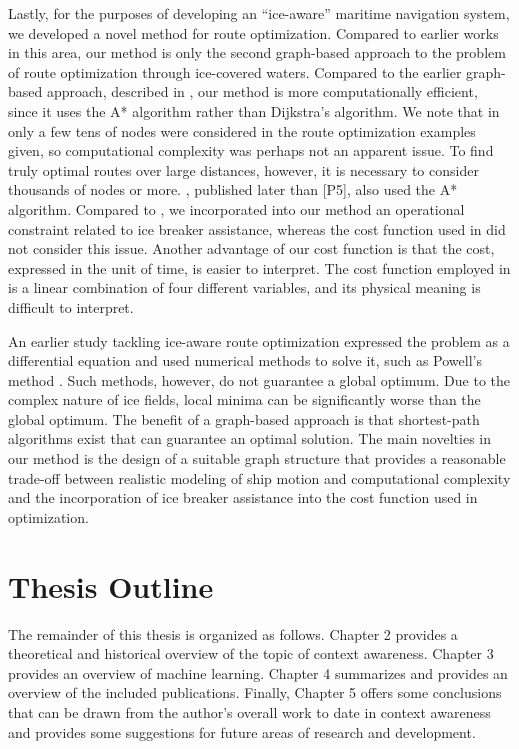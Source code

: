 Lastly, for the purposes of developing an ``ice-aware'' maritime navigation system, we developed a novel method for route optimization. Compared to earlier works in this area, our method is only the second graph-based approach to the problem of route optimization through ice-covered waters. Compared to the earlier graph-based approach, described in \cite{nam2013simulation}, our method is more computationally efficient, since it uses the A* algorithm rather than Dijkstra's algorithm. We note that in \cite{nam2013simulation} only a few tens of nodes were considered in the route optimization examples given, so computational complexity was perhaps not an apparent issue. To find truly optimal routes over large distances, however, it is necessary to consider thousands of nodes or more. \cite{choi2015arctic}, published later than [P5], also used the A* algorithm. Compared to \cite{choi2015arctic}, we incorporated into our method an operational constraint related to ice breaker assistance, whereas the cost function used in \cite{choi2015arctic} did not consider this issue. Another advantage of our cost function is that the cost, expressed in the unit of time, is easier to interpret. The cost function employed in \cite{choi2015arctic} is a linear combination of four different variables, and its physical meaning is difficult to interpret.

An earlier study tackling ice-aware route optimization expressed the problem as a differential equation and used numerical methods to solve it, such as Powell's method \cite{kotovirta2009system}. Such methods, however, do not guarantee a global optimum. Due to the complex nature of ice fields, local minima can be significantly worse than the global optimum. The benefit of a graph-based approach is that shortest-path algorithms exist that can guarantee an optimal solution. The main novelties in our method is the design of a suitable graph structure that provides a reasonable trade-off between realistic modeling of ship motion and computational complexity and the incorporation of ice breaker assistance into the cost function used in optimization.  

\section{Thesis Outline}
\label{sec:outline}
 
The remainder of this thesis is organized as follows. Chapter 2 provides a theoretical and historical overview of the topic of context awareness. Chapter 3 provides an overview of machine learning. Chapter 4 summarizes and provides an overview of the included publications. Finally, Chapter 5 offers some conclusions that can be drawn from the author's overall work to date in context awareness and provides some suggestions for future areas of research and development.